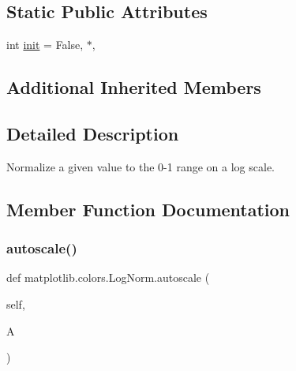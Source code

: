 \subsection*{Static Public Attributes}
\begin{DoxyCompactItemize}
\item 
int \hyperlink{classmatplotlib_1_1colors_1_1LogNorm_a1d80e624549db40949cd34a52d666743}{init} = False, $\ast$,
\end{DoxyCompactItemize}
\subsection*{Additional Inherited Members}


\subsection{Detailed Description}
\begin{DoxyVerb}Normalize a given value to the 0-1 range on a log scale.\end{DoxyVerb}
 

\subsection{Member Function Documentation}
\mbox{\label{classmatplotlib_1_1colors_1_1LogNorm_a933dea7f9ee81f98e421a60df03b27d5}} 
\subsubsection{\texorpdfstring{autoscale()}{autoscale()}}
{\footnotesize\ttfamily def matplotlib.\+colors.\+Log\+Norm.\+autoscale (\begin{DoxyParamCaption}\item[{}]{self,  }\item[{}]{A }\end{DoxyParamCaption})}

\mbox{\label{classmatplotlib_1_1colors_1_1LogNorm_af36e717fd109e1d41bc4808aa3f5c266}} 
